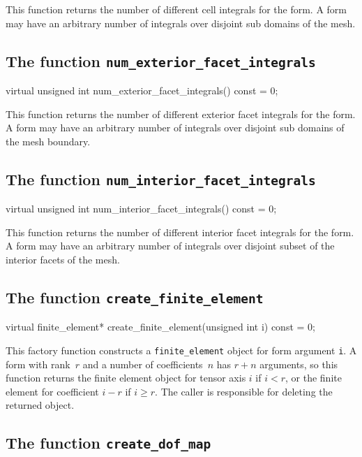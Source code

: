 This function returns the number of different cell integrals for the
form. A form may have an arbitrary number of integrals over disjoint
sub domains of the mesh.

\subsection{The function \texttt{num\_exterior\_facet\_integrals}}

\begin{code}
virtual unsigned int num_exterior_facet_integrals() const = 0;
\end{code}

This function returns the number of different exterior facet integrals
for the form. A form may have an arbitrary number of integrals over
disjoint sub domains of the mesh boundary.

\subsection{The function \texttt{num\_interior\_facet\_integrals}}

\begin{code}
virtual unsigned int num_interior_facet_integrals() const = 0;
\end{code}

This function returns the number of different interior facet integrals
for the form. A form may have an arbitrary number of integrals over
disjoint subset of the interior facets of the mesh.

\subsection{The function \texttt{create\_finite\_element}}

\begin{code}
virtual finite_element*
create_finite_element(unsigned int i) const = 0;
\end{code}

This factory function constructs a \texttt{finite\_element} object for
form argument \texttt{i}. A form with rank~$r$ and a number of
coefficients~$n$ has $r + n$ arguments, so this function
returns the finite element object for tensor axis $i$ if $i < r$, or
the finite element for coefficient $i - r$ if $i \geq r$.  The caller
is responsible for deleting the returned object.

\subsection{The function \texttt{create\_dof\_map}}

